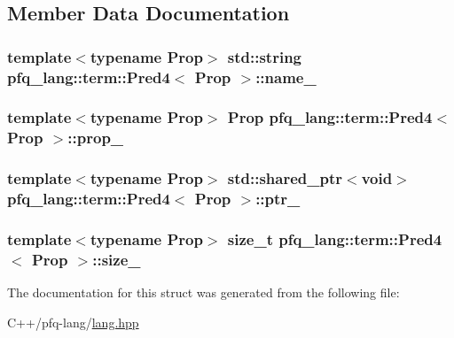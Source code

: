 \subsection{Member Data Documentation}
\hypertarget{structpfq__lang_1_1term_1_1Pred4_a57f3123042c7ab4bba88d975449624b5}{
\subsubsection[{name\+\_\+}]{\setlength{\rightskip}{0pt plus 5cm}template$<$typename Prop$>$ std\+::string {\bf pfq\+\_\+lang\+::term\+::\+Pred4}$<$ {\bf Prop} $>$\+::name\+\_\+}}\label{structpfq__lang_1_1term_1_1Pred4_a57f3123042c7ab4bba88d975449624b5}
\hypertarget{structpfq__lang_1_1term_1_1Pred4_ab5f3d36392d98a2549b8e517f8919163}{
\subsubsection[{prop\+\_\+}]{\setlength{\rightskip}{0pt plus 5cm}template$<$typename Prop$>$ {\bf Prop} {\bf pfq\+\_\+lang\+::term\+::\+Pred4}$<$ {\bf Prop} $>$\+::prop\+\_\+}}\label{structpfq__lang_1_1term_1_1Pred4_ab5f3d36392d98a2549b8e517f8919163}
\hypertarget{structpfq__lang_1_1term_1_1Pred4_abb2d1d1471c132aa44cb302ff97cb5d3}{
\subsubsection[{ptr\+\_\+}]{\setlength{\rightskip}{0pt plus 5cm}template$<$typename Prop$>$ std\+::shared\+\_\+ptr$<$void$>$ {\bf pfq\+\_\+lang\+::term\+::\+Pred4}$<$ {\bf Prop} $>$\+::ptr\+\_\+}}\label{structpfq__lang_1_1term_1_1Pred4_abb2d1d1471c132aa44cb302ff97cb5d3}
\hypertarget{structpfq__lang_1_1term_1_1Pred4_a8b048607b50bc442cf98b31987df7a53}{
\subsubsection[{size\+\_\+}]{\setlength{\rightskip}{0pt plus 5cm}template$<$typename Prop$>$ size\+\_\+t {\bf pfq\+\_\+lang\+::term\+::\+Pred4}$<$ {\bf Prop} $>$\+::size\+\_\+}}\label{structpfq__lang_1_1term_1_1Pred4_a8b048607b50bc442cf98b31987df7a53}


The documentation for this struct was generated from the following file\+:\begin{DoxyCompactItemize}
\item 
C++/pfq-\/lang/\hyperlink{lang_8hpp}{lang.\+hpp}\end{DoxyCompactItemize}
